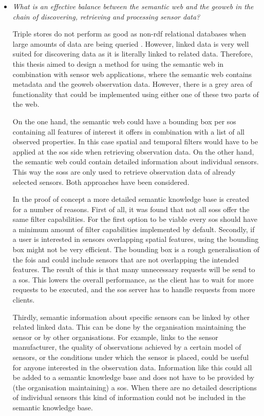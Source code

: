 \begin{itemize}
\item \textit{What is an effective balance between the semantic web and the geoweb in the chain of discovering, retrieving and processing sensor data?}%

Triple stores do not perform as good as non-\ac{rdf} relational databases when large amounts of data are being queried \citep{LD:Bizer2}. However, linked data is very well suited for discovering data as it is literally linked to related data. Therefore, this thesis aimed to design a method for using the semantic web in combination with sensor web applications, where the semantic web contains metadata and the geoweb observation data. However, there is a grey area of functionality that could be implemented using either one of these two parts of the web. 

On the one hand, the semantic web could have a bounding box per \ac{sos} containing all features of interest it offers in combination with a list of all observed properties. In this case spatial and temporal filters would have to be applied at the \ac{sos} side when retrieving observation data. On the other hand, the semantic web could contain detailed information about individual sensors. This way the \aclp{sos} are only used to retrieve observation data of already selected sensors. Both approaches have been considered.

In the proof of concept a more detailed semantic knowledge base is created for a number of reasons. First of all, it was found that not all \aclp{sos} offer the same filter capabilities. For the first option to be viable every \ac{sos} should have a minimum amount of filter capabilities implemented by default. 
Secondly, if a user is interested in sensors overlapping spatial features, using the bounding box might not be very efficient. The bounding box is a rough generalisation of the \acp{foi} and could include sensors that are not overlapping the intended features. The result of this is that many unnecessary requests will be send to a \ac{sos}. This lowers the overall performance, as the client has to wait for more requests to be executed, and the \ac{sos} server has to handle requests from more clients. 

Thirdly, semantic information about specific sensors can be linked by other related linked data. This can be done by the organisation maintaining the sensor or by other organisations. For example, links to the sensor manufacturer, the quality of observations achieved by a certain model of sensors, or the conditions under which the sensor is placed, could be useful for anyone interested in the observation data. Information like this could all be added to a semantic knowledge base and does not have to be provided by (the organisation maintaining) a \ac{sos}. When there are no detailed descriptions of individual sensors this kind of information could not be included in the semantic knowledge base. 


\end{itemize}
